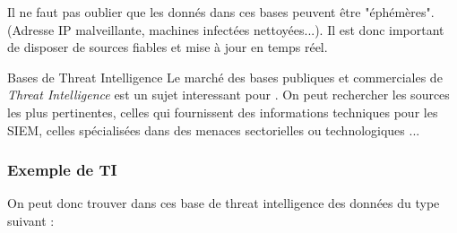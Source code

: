Il ne faut pas oublier que les donnés dans ces bases peuvent être  "éphémères". (Adresse IP malveillante, machines infectées nettoyées...). Il est donc important de disposer de sources fiables et mise à jour en temps réel.

\begin{techworkbox}{Bases de Threat Intelligence}
Le marché des bases publiques et commerciales de \textit{Threat Intelligence} est un sujet interessant pour \fichetech. On peut rechercher les sources les plus pertinentes, celles qui fournissent des informations techniques pour les SIEM, celles spécialisées dans des menaces sectorielles ou technologiques ...
\end{techworkbox}


\subsubsection{Exemple de TI}

On peut donc trouver dans ces base de threat intelligence des données du type suivant  :

